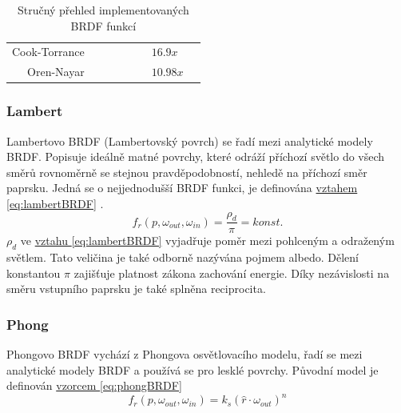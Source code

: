 \documentclass[czech,master,dept460,male,cpp,cpdeclaration]{diploma}
\newcommand{\uvec}[1]{\hat{#1}}
\newcommand{\true}{\ding{51}}
\newcommand{\false}{\ding{55}}
\begin{document}
\begin{table}[ht]
\begin{tabular}{r|lllllll}
        Cook-Torrance       & \true                    & \true                     & \true                       & \false                      & \false                   & \(16.9x\)                          &                               \\
        Oren-Nayar          & \true                    & \true                     & \false                      & \false                      & \true                    & \(10.98x\)                         &                               \\
        \hline
    \end{tabular}
    \caption{Stručný přehled implementovaných BRDF funkcí}
    \label{tab:brdfProperties}
\end{table}

\subsubsection{Lambert} \label{sec:Lambert}
Lambertovo BRDF (Lambertovský povrch) se řadí mezi analytické modely BRDF. Popisuje ideálně matné povrchy, které odráží příchozí světlo do všech směrů rovnoměrně se stejnou pravděpodobností, nehledě na příchozí směr paprsku. Jedná se o nejjednodušší BRDF funkci, je definována \hyperref[eq:lambertBRDF]{vztahem \ref{eq:lambertBRDF}} \cite{Koppal2014}.
\begin{equation} \label{eq:lambertBRDF}
    f_r\left(p,\omega_{out},\omega_{in}\right) = \frac{\rho_d}{\pi} = konst.
\end{equation}
\(\rho_d\) ve \hyperref[eq:lambertBRDF]{vztahu \ref{eq:lambertBRDF}} vyjadřuje poměr mezi pohlceným a odraženým světlem. Tato veličina je také odborně nazývána pojmem albedo. Dělení konstantou \(\pi\) zajišťuje platnost zákona zachování energie. Díky nezávislosti na směru vstupního paprsku je také splněna reciprocita.

\subsubsection{Phong} \label{sec:Phong}
Phongovo BRDF vychází z Phongova osvětlovacího modelu, řadí se mezi analytické modely BRDF a používá se pro lesklé povrchy. Původní model je definován \hyperref[eq:phongBRDF]{vzorcem \ref{eq:phongBRDF}} \cite{Phong1975}
\begin{equation} \label{eq:phongBRDF}
    f_r\left(p,\omega_{out},\omega_{in}\right) = k_s(\uvec{r}\cdot\omega_{out})^n
\end{equation}
\end{document}
